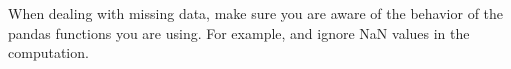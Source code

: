 When dealing with missing data, make sure you are aware of the behavior of the pandas functions you are using.
For example,  and  ignore NaN values in the computation.

\begin{comment}
\subsection*{Series}

A pandas \li{Series} is generalization of a one-dimensional NumPy array, or the column of a DataFrame.
Like a NumPy array, every \li{Series} has a data type (\li{dtype}), and the entries of the \li{Series} are all of that type.
Unlike a NumPy array, every \li{Series} has an \emph{index} that labels each entry, and a \li{Series} object can also be given a name to label the entire data set.

\begin{lstlisting}
>>> import numpy as np
>>> import pandas as pd

# Initialize a Series of random entries with an index of letters.
>>> pd.Series(np.random.random(4), index=['a', 'b', 'c', 'd'])
<<a    0.474170
b    0.106878
c    0.420631
d    0.279713
dtype: float64>>

# The default index is integers from 0 to the length of the data.
>>> pd.Series(np.random.random(4), name="uniform draws")
<<0    0.767501
1    0.614208
2    0.470877
3    0.335885
Name: uniform draws, dtype: float64>>
\end{lstlisting}

The index in a \li{Series} is a pandas object of type \li{Index} and is stored as the \li{index} attribute of the \li{Series}.
The plain entries in the \li{Series} are stored as a NumPy array and can be accessed as such via the \li{values} attribute.

\begin{lstlisting}
>>> s1 = pd.Series([1, 2, 3, 4], index=['a', 'b', 'c', 'd'], name="some ints")

>>> s1.values                           # Get the entries as a NumPy array.
<<array([1, 2, 3, 4])>>

>>> print(s1.name, s1.dtype, sep=", ")  # Get the name and dtype.
<<some ints, int64>>

>>> s1.index                            # Get the pd.Index object.
<<Index(['a', 'b', 'c', 'd'], dtype='object')>>
\end{lstlisting}


\end{comment}
